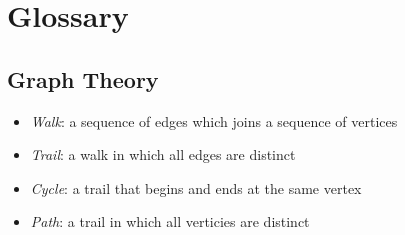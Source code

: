 \documentclass[12pt, titlepage]{article}
\begin{document}
\section{Glossary}

\subsection{Graph Theory}
\begin{itemize}
  \item \textit{Walk}: a sequence of edges which joins a sequence of vertices
  \item \textit{Trail}: a walk in which all edges are distinct
  \item \textit{Cycle}: a trail that begins and ends at the same vertex
  \item \textit{Path}: a trail in which all verticies are distinct
\end{itemize}
\end{document}
